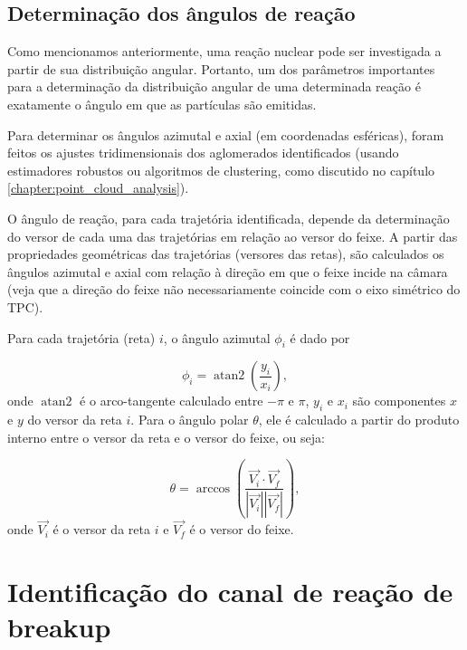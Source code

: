 \documentclass[a4paper,12pt,oneside]{book}
\DeclareMathOperator{\atantwo}{atan2}
\begin{document}
\subsection{Determinação dos ângulos de reação}

\par Como mencionamos anteriormente, uma reação nuclear pode ser investigada a partir de sua distribuição angular. Portanto, um dos parâmetros importantes para a determinação da distribuição angular de uma determinada reação é exatamente o ângulo em que as partículas são emitidas.  

\par Para determinar os ângulos azimutal e axial (em coordenadas esféricas), foram feitos os ajustes tridimensionais dos aglomerados identificados (usando estimadores robustos ou algoritmos de clustering, como discutido no capítulo \ref{chapter:point_cloud_analysis}).

\par O ângulo de reação, para cada trajetória identificada, depende da determinação do versor de cada uma das trajetórias em relação ao versor do feixe. A partir das propriedades geométricas das trajetórias (versores das retas), são calculados os ângulos azimutal e axial com relação à direção em que o feixe incide na câmara (veja que a direção do feixe não necessariamente coincide com o eixo simétrico do TPC).

\par Para cada trajetória (reta) $i$, o ângulo azimutal $\phi_i$ é dado por

\begin{equation}
	\phi_i = \atantwo \left (\frac{y_i}{x_i} \right),
\end{equation}
%
onde $\atantwo$ é o arco-tangente calculado entre $-\pi$ e $\pi$, $y_i$ e $x_i$ são componentes $x$ e $y$ do versor da reta $i$. Para o ângulo polar $\theta$, ele é calculado a partir do produto interno entre o versor da reta e o versor do feixe, ou seja:

\begin{equation}
	\theta = \arccos \left (\frac{\vec{V_i} \cdot \vec{V_f}}{|\vec{V_i}| |\vec{V_f}|}  \right),
\end{equation}
%
onde $\vec{V_i}$ é o versor da reta $i$ e $\vec{V_f}$ é o versor do feixe.

\section{Identificação do canal de reação de breakup}
\end{document}
